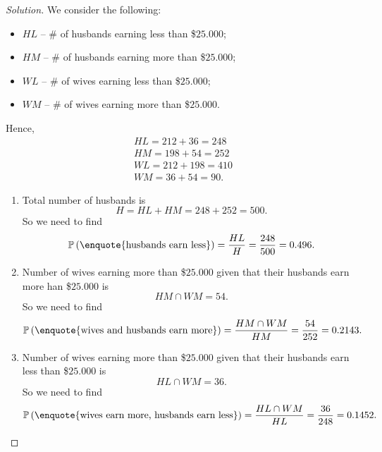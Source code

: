 \documentclass{article}[12pt]
\newenvironment{solution}
  {\renewcommand\qedsymbol{$\blacksquare$}\begin{proof}[Solution]}
  {\end{proof}}
\renewcommand{\P}{\mathbb{P}}
\begin{document}
\begin{solution}
We consider the following:
\begin{itemize}
    \item $HL$ -- \# of husbands earning less than \$$25.000$;
    \item $HM$ -- \# of husbands earning more than \$$25.000$;
    \item $WL$ -- \# of wives earning less than \$$25.000$;
    \item $WM$ -- \# of wives earning more than \$$25.000$.
\end{itemize}
Hence,
\begin{gather*}
    HL = 212 + 36 = 248
    \\
    HM = 198 + 54 = 252
    \\
    WL = 212 + 198 = 410
    \\
    WM = 36 + 54 = 90.
\end{gather*}
\begin{enumerate}[label=(\alph*)]
    \item Total number of husbands is
    \begin{equation*}
       H = HL + HM = 248 + 252 = 500.
    \end{equation*}
    So we need to find
    \begin{equation*}
        \P\left(\text{\enquote{husbands earn less}}\right) = \dfrac{HL}{H} = \dfrac{248}{500} = 0.496.
    \end{equation*}

    \item Number of wives earning more than \$$25.000$ given that their husbands earn more han \$$25.000$ is
    \begin{equation*}
        HM\cap WM = 54.
    \end{equation*}
    So we need to find
    \begin{equation*}
        \P\left(\text{\enquote{wives and husbands earn more}}\right) = \dfrac{HM\cap WM}{HM} = \dfrac{54}{252} = 0.2143.
    \end{equation*}

    \item Number of wives earning more than \$$25.000$ given that their husbands earn less than \$$25.000$ is
    \begin{equation*}
        HL\cap WM = 36.
    \end{equation*}
    So we need to find
    \begin{equation*}
        \P\left(\text{\enquote{wives earn more, husbands earn less}}\right) =
        \dfrac{HL\cap WM}{HL} = \dfrac{36}{248} = 0.1452.
    \end{equation*}
\end{enumerate}
\end{solution}
\end{document}
